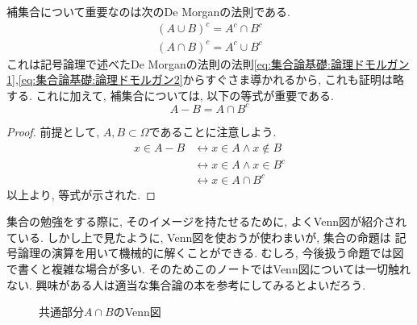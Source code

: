 \documentclass[a4j,dvipdfmx]{jsarticle}
\numberwithin{equation}{section}
\begin{document}
            補集合について重要なのは次のDe Morganの法則である.
            \begin{align}
                (A\cup B)^c = A^c \cap B^c \label{eq:集合論基礎:集合ドモルガン1}\\
                (A\cap B)^c = A^c \cup B^c \label{eq:集合論基礎:集合ドモルガン2}
            \end{align}
            これは記号論理で述べたDe Morganの法則の法則\eqref{eq:集合論基礎:論理ドモルガン1},\eqref{eq:集合論基礎:論理ドモルガン2}からすぐさま導かれるから, これも証明は略する.
            これに加えて, 補集合については, 以下の等式が重要である.
            \begin{equation}
                A-B = A\cap B^c \label{eq:集合論基礎:差集合を補集合で表す}
            \end{equation}
            \begin{proof}
                前提として, $A,B\subset \varOmega$であることに注意しよう.
                \begin{align*}
                    x\in A-B 
                    &\leftrightarrow x\in A \land x\not\in B\\
                    &\leftrightarrow x\in A \land x\in B^c\\
                    &\leftrightarrow x\in A\cap B^c
                \end{align*}
                以上より, 等式が示された.
            \end{proof}
            集合の勉強をする際に, そのイメージを持たせるために, よくVenn図が紹介されている. しかし上で見たように, Venn図を使おうが使わまいが, 集合の命題は
            記号論理の演算を用いて機械的に解くことができる. むしろ, 今後扱う命題では図で書くと複雑な場合が多い.
            そのためこのノートではVenn図については一切触れない. 興味がある人は適当な集合論の本を参考にしてみるとよいだろう.
            \begin{figure}[h]
                \centering
                \caption{共通部分$A\cap B$のVenn図}
            \end{figure}
        \clearpage
\end{document}
